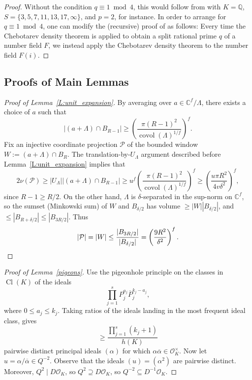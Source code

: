\documentclass[11pt,reqno]{amsart}
\numberwithin{equation}{section}
\theoremstyle{definition}
\theoremstyle{remark}
\newcommand{\on}{\operatorname}
\newcommand{\C}{\mathbb{C}}
\newcommand{\Q}{\mathbb{Q}}
\renewcommand{\O}{\mathcal{O}}
\newcommand{\covol}{\on{covol}}
\begin{document}
\begin{proof}
Without the condition $q\equiv 1\bmod{4}$,
this would follow from
\cite[Theorem 2.8 of arXiv version, or Theorem 4 of published version]{hajir2021cutting}
with $K=\Q$, $S=\{3,5,7,11,13,17,\infty\}$, and $p=2$, for instance.
In order to arrange for $q\equiv 1\bmod{4}$,
one can modify the (recursive) proof of \cite[loc. cit.]{hajir2021cutting} as follows:
Every time the Chebotarev density theorem is applied to obtain a split rational prime $q$
of a number field $F$,
we instead apply the Chebotarev density theorem to the number field $F(i)$.
\end{proof}

\subsection{Proofs of Main Lemmas}

\begin{proof}[Proof of Lemma~\ref{L:unit_expansion}]
By averaging over $a\in \C^f/\Lambda$, there exists a choice of $a$ such that
\begin{equation*}
|(a+\Lambda)\cap B_{R-1}|
\ge \left(\frac{\pi (R-1)^2}{\covol(\Lambda)^{1/f}}\right)^f.
\end{equation*}
Fix an injective coordinate projection $\mathcal{P}$
of the bounded window $W := (a+\Lambda)\cap B_R$.
The translation-by-$U_\Lambda$ argument
described before Lemma~\ref{L:unit_expansion} implies that
\begin{equation*}
2\nu(\mathcal{P}) \ge |U_\Lambda||(a+\Lambda)\cap B_{R-1}|
\ge u^f \left(\frac{\pi (R-1)^2}{\covol(\Lambda)^{1/f}}\right)^f
\ge \left(\frac{u \pi R^2}{4v\delta^{2}}\right)^f,
\end{equation*}
since $R-1 \ge R/2$.
On the other hand, $\Lambda$ is $\delta$-separated
in the sup-norm on $\C^f$,
so the sumset (Minkowski sum) of $W$ and $B_{\delta/2}$
has volume $\ge |W| |B_{\delta/2}|$,
and $\le |B_{R+\delta/2}| \le |B_{3R/2}|$.
Thus
\begin{equation*}
|\mathcal{P}| = |W| \le \frac{|B_{3R/2}|}{|B_{\delta/2}|}
= \left(\frac{9R^2}{\delta^2}\right)^{f}. \qedhere
\end{equation*}
\end{proof}

\begin{proof}[Proof of Lemma~\ref{pigeons}]
Use the pigeonhole principle on the classes in $\on{Cl}(K)$
of the ideals $$\prod_{j=1}^{s} P_j^{a_j} \overline{P}_j^{k_j-a_j},$$
where $0\le a_j\le k_j$.
Taking ratios of the ideals landing in the most frequent ideal class, gives
$$\ge \frac{\prod_{j=1}^{s} (k_j+1)}{h(K)}$$
pairwise distinct principal ideals $(\alpha)$
for which $\alpha \overline{\alpha} \in \O_K^\times$.
Now let $u = \alpha / \overline{\alpha} \in Q^{-2}$.
Observe that the ideals $(u) = (\alpha^2)$ are pairwise distinct.
Moreover, $Q^2\mid D \O_K$,
so $Q^2\supseteq D \O_K$,
so $Q^{-2}\subseteq D^{-1} \O_K$.
\end{proof}
\end{document}
